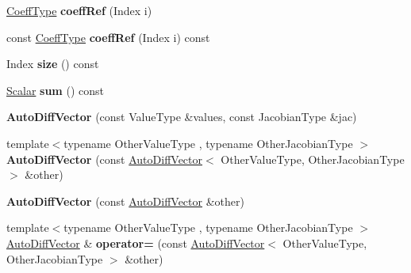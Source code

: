 \begin{DoxyCompactItemize}
\hyperlink{class_eigen_1_1_auto_diff_scalar}{Coeff\+Type} {\bfseries coeff\+Ref} (Index i)
\item 
\mbox{\label{class_eigen_1_1_auto_diff_vector_a783b34af73b298817436cc112c96a2d9}} 
const \hyperlink{class_eigen_1_1_auto_diff_scalar}{Coeff\+Type} {\bfseries coeff\+Ref} (Index i) const
\item 
\mbox{\label{class_eigen_1_1_auto_diff_vector_a2313e11718a7a613603b6bc8e7c19a76}} 
Index {\bfseries size} () const
\item 
\mbox{\label{class_eigen_1_1_auto_diff_vector_afacee684d50566591abb11c7654661b2}} 
\hyperlink{class_eigen_1_1_auto_diff_scalar}{Scalar} {\bfseries sum} () const
\item 
\mbox{\label{class_eigen_1_1_auto_diff_vector_a63ca0218770504e623af4211150af918}} 
{\bfseries Auto\+Diff\+Vector} (const Value\+Type \&values, const Jacobian\+Type \&jac)
\item 
\mbox{\label{class_eigen_1_1_auto_diff_vector_ac0e6c4be6a7273fe031534143855941b}} 
{\footnotesize template$<$typename Other\+Value\+Type , typename Other\+Jacobian\+Type $>$ }\\{\bfseries Auto\+Diff\+Vector} (const \hyperlink{class_eigen_1_1_auto_diff_vector}{Auto\+Diff\+Vector}$<$ Other\+Value\+Type, Other\+Jacobian\+Type $>$ \&other)
\item 
\mbox{\label{class_eigen_1_1_auto_diff_vector_a8594f8d205158989d0d1cb38c53ffe0a}} 
{\bfseries Auto\+Diff\+Vector} (const \hyperlink{class_eigen_1_1_auto_diff_vector}{Auto\+Diff\+Vector} \&other)
\item 
\mbox{\label{class_eigen_1_1_auto_diff_vector_a1a2b89be2583d4fb8b4386d1447e02d4}} 
{\footnotesize template$<$typename Other\+Value\+Type , typename Other\+Jacobian\+Type $>$ }\\\hyperlink{class_eigen_1_1_auto_diff_vector}{Auto\+Diff\+Vector} \& {\bfseries operator=} (const \hyperlink{class_eigen_1_1_auto_diff_vector}{Auto\+Diff\+Vector}$<$ Other\+Value\+Type, Other\+Jacobian\+Type $>$ \&other)

\end{DoxyCompactItemize}
